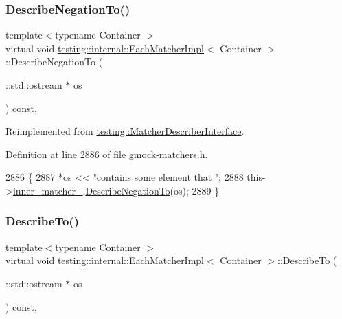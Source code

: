 \subsubsection{\texorpdfstring{Describe\+Negation\+To()}{DescribeNegationTo()}}
{\footnotesize\ttfamily template$<$typename Container $>$ \\
virtual void \hyperlink{classtesting_1_1internal_1_1EachMatcherImpl}{testing\+::internal\+::\+Each\+Matcher\+Impl}$<$ Container $>$\+::Describe\+Negation\+To (\begin{DoxyParamCaption}\item[{\+::std\+::ostream $\ast$}]{os }\end{DoxyParamCaption}) const\hspace{0.3cm}{\ttfamily [inline]}, {\ttfamily [virtual]}}



Reimplemented from \hyperlink{classtesting_1_1MatcherDescriberInterface_a2071afbc47097c4d1c0064275af34db0}{testing\+::\+Matcher\+Describer\+Interface}.



Definition at line 2886 of file gmock-\/matchers.\+h.


\begin{DoxyCode}
2886                                                         \{
2887     *os << \textcolor{stringliteral}{"contains some element that "};
2888     this->\hyperlink{classtesting_1_1internal_1_1QuantifierMatcherImpl_af0ee2a4697f5cb8e937fd29dd75e2a30}{inner\_matcher\_}.\hyperlink{classtesting_1_1internal_1_1MatcherBase_ac1089d49b6b8a381900618985cd69b7f}{DescribeNegationTo}(os);
2889   \}
\end{DoxyCode}
\mbox{\label{classtesting_1_1internal_1_1EachMatcherImpl_a605e1c800c74701a773205ec050cd574}} 
\subsubsection{\texorpdfstring{Describe\+To()}{DescribeTo()}}
{\footnotesize\ttfamily template$<$typename Container $>$ \\
virtual void \hyperlink{classtesting_1_1internal_1_1EachMatcherImpl}{testing\+::internal\+::\+Each\+Matcher\+Impl}$<$ Container $>$\+::Describe\+To (\begin{DoxyParamCaption}\item[{\+::std\+::ostream $\ast$}]{os }\end{DoxyParamCaption}) const\hspace{0.3cm}{\ttfamily [inline]}, {\ttfamily [virtual]}}



